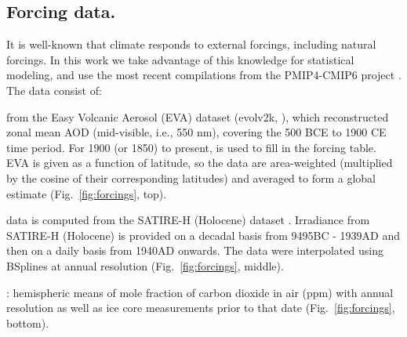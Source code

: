 \documentclass[12pt]{amsart}
\theoremstyle{plain}
\theoremstyle{definition}
\theoremstyle{remark}
\newcommand{\lb}[1]{\color{MidnightBlue}\textbf{[LB: #1]}\normalcolor}
\newcommand{\jeg}[1]{\color{ProcessBlue}\textbf{[JEG: #1]}\normalcolor}
\begin{document}

\subsection{Forcing data.}
It is well-known that climate responds to external forcings, including natural forcings. In this work we take advantage of this knowledge for statistical modeling, and use the most recent compilations from the PMIP4-CMIP6 project \citep{JungclausGMD17,Kageyama_GMD2017}. The data consist of:

 from the Easy Volcanic Aerosol (EVA) dataset (evolv2k,
  \cite{Toohey2016}), which reconstructed zonal mean AOD (mid-visible, i.e., 550 nm), covering the
  500 BCE to 1900 CE time period. For 1900 (or 1850) to present, \cite{Thomason2016} is
  used to fill in the forcing table. EVA is given as a function of latitude, so the data are area-weighted (multiplied by the cosine of their corresponding latitudes) and averaged to form a global estimate (Fig.~\ref{fig:forcings}, top).
  
 data is computed from the SATIRE-H
  (Holocene) dataset \citep{Vieira2011}. Irradiance from SATIRE-H (Holocene) is
  provided on a decadal basis from 9495BC - 1939AD and then on a daily basis
  from 1940AD onwards. The data were interpolated using BSplines  at annual resolution (Fig.~\ref{fig:forcings}, middle). 
  
: hemispheric means of mole
  fraction of carbon dioxide in air (ppm) with annual
  resolution \citep{Meinshausen_GMD2017} as well as ice core measurements prior to that date \citep{JungclausGMD17} (Fig.~\ref{fig:forcings}, bottom).
\end{document}
